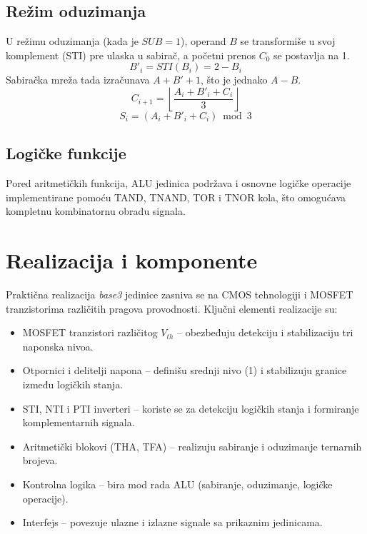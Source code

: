 \documentclass[conference,a4paper]{IEEEtran}
\begin{document}
	\subsection{Režim oduzimanja}
	
	U režimu oduzimanja (kada je $SUB=1$), operand $B$ se transformiše u svoj komplement (STI) pre ulaska u sabirač, a početni prenos $C_0$ se postavlja na 1.
	\begin{equation}
		B'_i = STI(B_i) = 2 - B_i
	\end{equation}
	Sabiračka mreža tada izračunava $A + B' + 1$, što je jednako $A - B$.
	\begin{equation}
		C_{i+1} = \left\lfloor \frac{A_i + B'_i + C_i}{3} \right\rfloor
	\end{equation}
	\begin{equation}
		S_i = (A_i + B'_i + C_i) \bmod 3
	\end{equation}
	
	\subsection{Logičke funkcije}
	
	Pored aritmetičkih funkcija, ALU jedinica podržava i osnovne logičke operacije implementirane pomoću TAND, TNAND, TOR i TNOR kola, što omogućava kompletnu kombinatornu obradu signala.
	
	\section{Realizacija i komponente}
	
	Praktična realizacija \textit{base3} jedinice zasniva se na CMOS tehnologiji i MOSFET tranzistorima različitih pragova provodnosti.
	Ključni elementi realizacije su:
	
	\begin{itemize}
		\item MOSFET tranzistori različitog $V_{th}$ – obezbeđuju detekciju i stabilizaciju tri naponska nivoa.
		\item Otpornici i delitelji napona – definišu srednji nivo (1) i stabilizuju granice između logičkih stanja.
		\item STI, NTI i PTI inverteri – koriste se za detekciju logičkih stanja i formiranje komplementarnih signala.
		\item Aritmetički blokovi (THA, TFA) – realizuju sabiranje i oduzimanje ternarnih brojeva.
		\item Kontrolna logika – bira mod rada ALU (sabiranje, oduzimanje, logičke operacije).
		\item Interfejs – povezuje ulazne i izlazne signale sa prikaznim jedinicama.
	\end{itemize}
	
\end{document}
